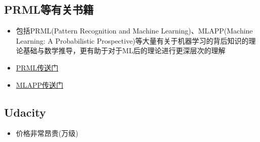 \documentclass{ctexart}
\begin{document}
\subsection{PRML等有关书籍}

\begin{itemize}
	\item 包括PRML(Pattern Recognition and Machine Learning)、MLAPP(Machine Learning: A Probabilistic Prospective)等大量有关于机器学习的背后知识的理论基础与数学推导，更有助于对于ML后的理论进行更深层次的理解
    \item \href{https://github.com/csuldw/MachineLearning/blob/master/doc/PRML\_Zh.pdf}{PRML传送门}
    \item \href{http://vdisk.weibo.com/s/jTT1B}{MLAPP传送门}
\end{itemize}

\subsection{Udacity}

\begin{itemize}
\item 价格非常昂贵(万级)
\end{itemize}
\end{document}
